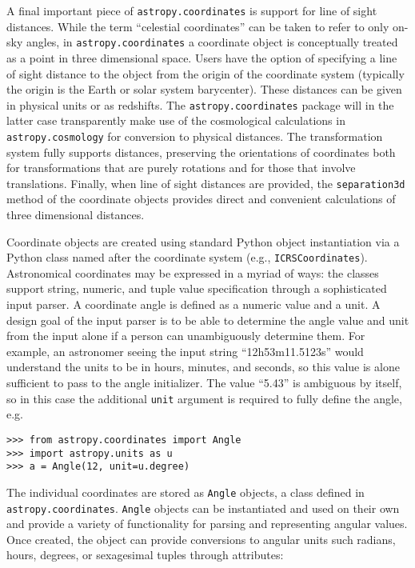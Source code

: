 \documentclass[traditabstract]{aa}
\begin{document}

A final important piece of \texttt{astropy.coordinates} is support for line of
sight distances. While the term ``celestial coordinates'' can be taken to
refer to only on-sky angles, in \texttt{astropy.coordinates} a coordinate
object is conceptually treated as a point in three dimensional space. Users
have the option of specifying a line of sight distance to the object from the
origin of the coordinate system (typically the origin is the Earth or solar
system barycenter). These distances can be given in physical units or as
redshifts. The \texttt{astropy.coordinates} package will in the latter case
transparently make use of the cosmological calculations in
\texttt{astropy.cosmology} for conversion to physical distances. The
transformation system fully supports distances, preserving the orientations of
coordinates both for transformations that are purely rotations and for those
that involve translations. Finally, when line of sight distances are provided,
the \texttt{separation3d} method of the coordinate objects provides direct and
convenient calculations of three dimensional distances.


Coordinate objects are created using standard Python object instantiation via
a Python class named after the coordinate system (e.g.,
\texttt{ICRSCoordinates}). Astronomical coordinates may be expressed in a
myriad of ways: the classes support string, numeric, and tuple value
specification through a sophisticated input parser. A coordinate angle is
defined as a numeric value and a unit. A design goal of the input parser is to
be able to determine the angle value and unit from the input alone if a person
can unambiguously determine them. For example, an astronomer seeing the input
string ``12h53m11.5123s'' would understand the units to be in hours, minutes,
and seconds, so this value is alone sufficient to pass to the angle
initializer. The value ``5.43'' is ambiguous by itself, so in this case the
additional \texttt{unit} argument is required to fully define the angle, e.g.

\begin{verbatim}
>>> from astropy.coordinates import Angle
>>> import astropy.units as u
>>> a = Angle(12, unit=u.degree)
\end{verbatim}

The individual coordinates are stored as \texttt{Angle} objects, a class
defined in \texttt{astropy.coordinates}. \texttt{Angle} objects can be
instantiated and used on their own and provide a variety of functionality for
parsing and representing angular values. Once created, the object can provide
conversions to angular units such radians, hours, degrees, or sexagesimal
tuples through attributes:
\end{document}
